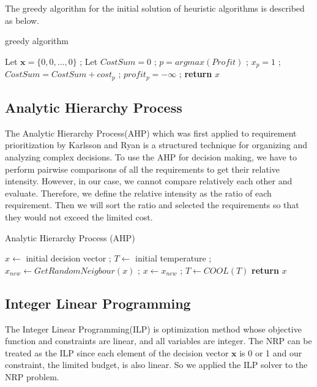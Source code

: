 The greedy algorithm for the initial solution of heuristic algorithms is described as below. 

\begin{algorithm}
\caption{greedy algorithm}\label{alg:greedy}
\begin{algorithmic}
    \State Let $\textbf{x} = \{0, 0, \ldots, 0\}$ ;
    \State Let $CostSum = 0$ ;
        \State $p = argmax(Profit)$ ;
            \State $x_p = 1$ ;
            \State $CostSum = CostSum + cost_p$ ;
        \EndIf
        \State $profit_p = -\infty$ ;
    \EndFor
    \textbf{return} $x$
\end{algorithmic}
\end{algorithm}


\subsection{Analytic Hierarchy Process}
The Analytic Hierarchy Process(AHP) which was first applied to requirement prioritization by Karlsson and Ryan\cite{AHP} is a structured technique for organizing and analyzing complex decisions. To use the AHP for decision making, we have to perform pairwise comparisons of all the requirements to get their relative intensity. However, in our case, we cannot compare relatively each other and evaluate. Therefore, we define the relative intensity as the ratio of each requirement. Then we will sort the ratio and selected the requirements so that they would not exceed the limited cost.


\begin{algorithm}
\caption{Analytic Hierarchy Process (AHP)}\label{alg:AHP}
\begin{algorithmic}
    \State $x \gets$ initial decision vector ;
    \State $T \gets$ initial temperature ; 
        \State $x_{new} \gets GetRandomNeigbour(x)$ ;
            \State $x \gets x_{new}$ ;
        \EndIf
        \State $T \gets COOL(T)$ 
    \EndWhile
    \textbf{return} $x$
\end{algorithmic}
\end{algorithm}

\subsection{Integer Linear Programming}
The Integer Linear Programming(ILP) is optimization method whose objective function and constraints are linear, and all variables are integer. The NRP can be treated as the ILP since each element of the decision vector $\textbf{x}$ is 0 or 1 and our constraint, the limited budget, is also linear. So we applied the ILP solver to the NRP problem.

